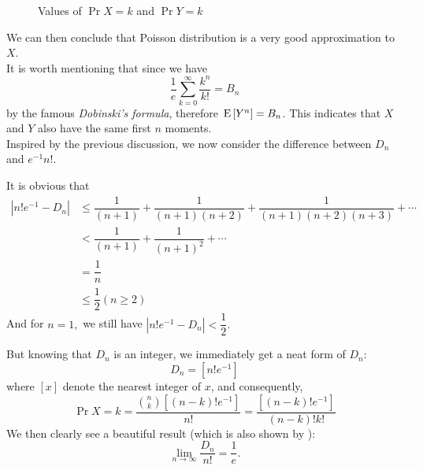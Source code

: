 \begin{figure}[H]
{  }
  \caption{Values of $ \Pr{X=k}$ and $ \Pr{Y=k}$\label{fig:diff}}
\end{figure}

We can then conclude that Poisson distribution is a very good approximation to $ X$.
\\

It is worth mentioning that since we have
\[ \dfrac{1}{e}\sum_{k=0}^{\infty}\dfrac{k^n}{k!} = B_n\]
by the famous \emph{Dobinski's formula}, therefore $\text{E}\left[Y^n\right] = B_n$. This indicates that $ X$ and
$ Y$ also have the same first $ n$ moments.
\\

Inspired by the previous discussion, we now consider the difference between $ D_n $ and $ e^{-1}n!$.

It is obvious that
\begin{align*}
|n! e^{-1} - D_n| & \le \dfrac{1}{(n+1)}+\dfrac{1}{(n+1)(n+2)}+ \dfrac{1}{(n+1)(n+2)(n+3)}+\cdots \\
&< \dfrac{1}{(n+1)} + \dfrac{1}{(n+1)^2 }+ \cdots  \\
& =\dfrac{1}{n}\\
& \le \dfrac{1}{2} ( n \ge 2)
\end{align*}
And for $ n=1,$ we still have $ |n!e^{-1}-D_n| < \dfrac{1}{2}.$

But knowing that $ D_n$ is an integer, we immediately get a neat form of $ D_n$:
\[  D_n = [ n!e^{-1}]\]
where $ [x]$ denote the nearest integer of $ x$, and consequently,
\[ \Pr{X=k} = \dfrac{{n\choose{k}}[(n-k)!e^{-1}]}{n!}= \dfrac{[(n-k)!e^{-1}]}{(n-k)!k!}\]
We then clearly see a beautiful result (which is also shown by ):
\[ \lim\limits_{n\to\infty}\dfrac{D_n}{n!} = \dfrac{1}{e}.\]

